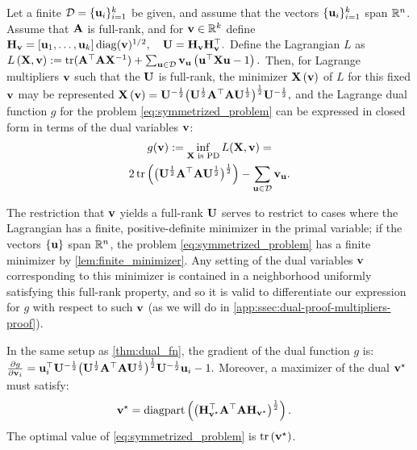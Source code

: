 \documentclass{article} %
\theoremstyle{named}
\begin{document}
\begin{thm}\label{thm:dual_fn}
Let a finite $\mathcal{D} = \{\mathbf{u}_i\}_{i=1}^k$ be given, and assume that the vectors $\{\mathbf{u}_i\}_{i=1}^k$ span $\mathbb{R}^n$. Assume that $\mathbf{A}$ is full-rank, and for $\mathbf{v} \in \mathbb{R}^k$ define 
$
\mathbf{H}_{\mathbf{v}} = [\mathbf{u}_1, \dots, \mathbf{u}_k] \operatorname{diag}(\mathbf{v})^{1/2}, \quad \mathbf{U} = \mathbf{H}_{\mathbf{v}}\mathbf{H}_{\mathbf{v}}^\top.
$
Define the Lagrangian $L$ as
$
L\left(\mathbf{X}, \mathbf{v}\right) := \mathrm{tr}(\mathbf{A}^\top\mathbf{A}\mathbf{X}^{-1})
     + \sum_{\mathbf{u} \in \mathcal{D}} \mathbf{v}_{\mathbf{u}} \left(\mathbf{u}^\top \mathbf{X} \mathbf{u} - 1\right).
$
Then, for Lagrange multipliers $\mathbf{v}$ such that the $\mathbf{U}$ is full-rank, the minimizer $\mathbf{X}\left(\mathbf{v}\right)$ of $L$ for this fixed $\mathbf{v}$ may be represented
$
\mathbf{X}\left(\mathbf{v}\right) = \mathbf{U}^{-\frac{1}{2}} \big(\mathbf{U}^\frac{1}{2} \mathbf{A}^\top\mathbf{A} \mathbf{U}^\frac{1}{2} \big)^\frac{1}{2} \mathbf{U}^{-\frac{1}{2}},
$
and the Lagrange dual function $g$ for the problem \cref{eq:symmetrized_problem} can be expressed in closed form in terms of the dual variables $\mathbf{v}$: 
\begin{equation}\label{eq:dual_fn_rep}
\begin{gathered}[b]
g(\mathbf{v}) := \inf_{\mathbf{X}\text{ is PD}} L(\mathbf{X}, \mathbf{v}) = \\
2\,\mathrm{tr} \left( \big(\mathbf{U}^\frac{1}{2} \mathbf{A}^\top\mathbf{A} \mathbf{U}^\frac{1}{2} \big)^\frac{1}{2} \right) - \sum_{\mathbf{u}\in\mathcal{D}} \mathbf{v}_{\mathbf{u}}.
\end{gathered}
\end{equation}
\end{thm}
 The restriction that $\mathbf{v}$ yields a full-rank $\mathbf{U}$ serves to restrict to cases where the Lagrangian has a finite, positive-definite minimizer in the primal variable; if the vectors $\{\mathbf{u}\}$ span $\mathbb{R}^n$, the problem \cref{eq:symmetrized_problem} has a finite minimizer by \cref{lem:finite_minimizer}. Any setting of the dual variables $\mathbf{v}$ corresponding to this minimizer is contained in a neighborhood uniformly satisfying this full-rank property, and so it is valid to differentiate our expression for $g$ with respect to such $\mathbf{v}$ (as we will do in \cref{app:ssec:dual-proof-multipliers-proof}).
\begin{cor}\label{cor:gen_fixed_point}
In the same setup as \cref{thm:dual_fn}, the gradient of the dual function $g$ is:
$
 \frac{\partial g}{\partial \mathbf{v}_i} =  \mathbf{u}_i^\top \mathbf{U}^{-\frac{1}{2}} \big(\mathbf{U}^\frac{1}{2} \mathbf{A}^\top\mathbf{A} \mathbf{U}^\frac{1}{2} \big)^\frac{1}{2} \mathbf{U}^{-\frac{1}{2}} \mathbf{u}_i - 1.
$
Moreover, a maximizer of the dual ${\mathbf{v}^\star}$ must satisfy:
\begin{align}
{\ensuremath{\mathbf{v}}^\star} 
  &= \operatorname{diagpart}\left(\big(\mathbf{H}_{{\mathbf{v}^\star}}^\top \mathbf{A}^\top\mathbf{A} \mathbf{H}_{{\mathbf{v}^\star}}\big)^\frac{1}{2}\right)  \label{eq:genfixedpoint}.
\end{align}
The optimal value of \cref{eq:symmetrized_problem} is $\mathrm{tr}\left({\mathbf{v}^\star}\right)$.
\end{cor}
\end{document}
